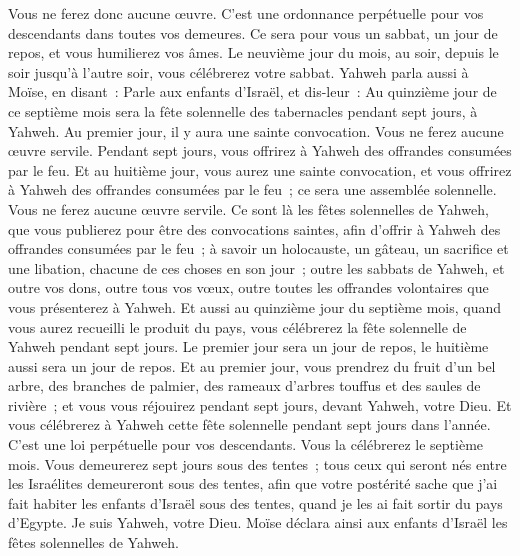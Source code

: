 \begin{multicols}{2}
Vous ne ferez donc aucune œuvre. C'est une ordonnance perpétuelle pour vos descendants dans toutes vos demeures.
Ce sera pour vous un sabbat, un jour de repos, et vous humilierez vos âmes. Le neuvième jour du mois, au soir, depuis le soir jusqu'à l'autre soir, vous célébrerez votre sabbat.
Yahweh parla aussi à Moïse, en disant~:
Parle aux enfants d'Israël, et dis-leur~: Au quinzième jour de ce septième mois sera la fête solennelle des tabernacles pendant sept jours, à Yahweh.
Au premier jour, il y aura une sainte convocation. Vous ne ferez aucune œuvre servile.
Pendant sept jours, vous offrirez à Yahweh des offrandes consumées par le feu. Et au huitième jour, vous aurez une sainte convocation, et vous offrirez à Yahweh des offrandes consumées par le feu~; ce sera une assemblée solennelle. Vous ne ferez aucune œuvre servile.
Ce sont là les fêtes solennelles de Yahweh, que vous publierez pour être des convocations saintes, afin d'offrir à Yahweh des offrandes consumées par le feu~; à savoir un holocauste, un gâteau, un sacrifice et une libation, chacune de ces choses en son jour~;
outre les sabbats de Yahweh, et outre vos dons, outre tous vos vœux, outre toutes les offrandes volontaires que vous présenterez à Yahweh.
Et aussi au quinzième jour du septième mois, quand vous aurez recueilli le produit du pays, vous célébrerez la fête solennelle de Yahweh pendant sept jours. Le premier jour sera un jour de repos, le huitième aussi sera un jour de repos.
Et au premier jour, vous prendrez du fruit d'un bel arbre, des branches de palmier, des rameaux d'arbres touffus et des saules de rivière~; et vous vous réjouirez pendant sept jours, devant Yahweh, votre Dieu.
Et vous célébrerez à Yahweh cette fête solennelle pendant sept jours dans l'année. C'est une loi perpétuelle pour vos descendants. Vous la célébrerez le septième mois.
Vous demeurerez sept jours sous des tentes~; tous ceux qui seront nés entre les Israélites demeureront sous des tentes,
afin que votre postérité sache que j'ai fait habiter les enfants d'Israël sous des tentes, quand je les ai fait sortir du pays d'Egypte. Je suis Yahweh, votre Dieu.
Moïse déclara ainsi aux enfants d'Israël les fêtes solennelles de Yahweh.

\end{multicols}

